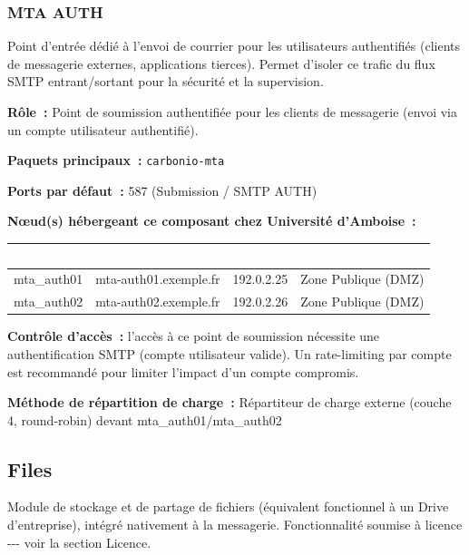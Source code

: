 \documentclass[11pt,a4paper]{report}
\newcommand{\tblhead}[1]{\textcolor{white}{\textbf{#1}}}
\begin{document}
\subsubsection{MTA AUTH}

Point d'entrée dédié à l'envoi de courrier pour les utilisateurs authentifiés (clients de messagerie externes, applications tierces).\allowbreak{} Permet d'isoler ce trafic du flux SMTP entrant/sortant pour la sécurité et la supervision.\allowbreak{}

\textbf{Rôle~:} Point de soumission authentifiée pour les clients de messagerie (envoi via un compte utilisateur authentifié).\allowbreak{}


\textbf{Paquets principaux~:} \texttt{carbonio-\allowbreak{}mta}

\textbf{Ports par défaut~:} 587 (Submission / SMTP AUTH)

\textbf{Nœud(s) hébergeant ce composant chez Université d'Amboise~:}
\begin{longtable}{|p{3.2cm}|p{4.5cm}|p{3.2cm}|p{2.3cm}|}
\hline
\rowcolor{primary}\tblhead{Nœud} & \tblhead{Hostname} & \tblhead{IP} & \tblhead{Zone} \\
\hline
\endhead
mta\_auth01 & mta-\allowbreak{}auth01.\allowbreak{}exemple.\allowbreak{}fr & 192.\allowbreak{}0.\allowbreak{}2.\allowbreak{}25 & Zone Publique (DMZ) \\
\hline
mta\_auth02 & mta-\allowbreak{}auth02.\allowbreak{}exemple.\allowbreak{}fr & 192.\allowbreak{}0.\allowbreak{}2.\allowbreak{}26 & Zone Publique (DMZ) \\
\hline
\end{longtable}

\textbf{Contrôle d'accès~:} l'accès à ce point de soumission nécessite une authentification SMTP (compte utilisateur valide). Un rate-limiting par compte est recommandé pour limiter l'impact d'un compte compromis.

\textbf{Méthode de répartition de charge~:} Répartiteur de charge externe (couche 4, round-\allowbreak{}robin) devant mta\_auth01/mta\_auth02


\subsection{Files}

Module de stockage et de partage de fichiers (équivalent fonctionnel à un Drive d'entreprise), intégré nativement à la messagerie.\allowbreak{} Fonctionnalité soumise à licence -\allowbreak{}-\allowbreak{}-\allowbreak{} voir la section Licence.\allowbreak{}
\end{document}
